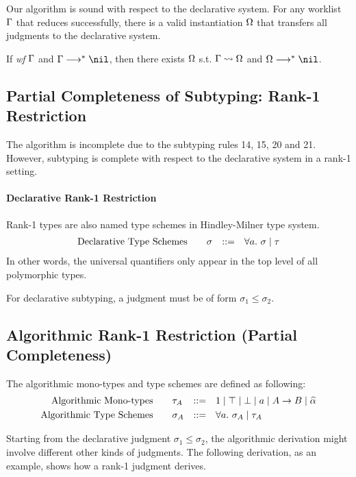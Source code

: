 Our algorithm is sound with respect to the declarative system.
For any worklist $\Gamma$ that reduces successfully,
there is a valid instantiation $\Omega$ that transfers all judgments
to the declarative system.
\begin{theorem}[Soundness]
If \emph{wf }$\Gamma$ and $\Gm \redto \nil$,
then there exists $\Omega$ s.t. $\Gamma \rightsquigarrow \Omega$ and $\Om \redto \nil$.
\end{theorem}

\subsection{Partial Completeness of Subtyping: Rank-1 Restriction}

The algorithm is incomplete due to the subtyping rules 14, 15, 20 and 21.
However, subtyping is complete with respect to the declarative system in a rank-1 setting.

\paragraph{Declarative Rank-1 Restriction}

Rank-1 types are also named type schemes in Hindley-Milner type system.
$$\begin{aligned}
    \text{Declarative Type Schemes}\qquad&\sigma &::=&\quad \all \sigma \mid \tau\\
\end{aligned}$$
In other words, the universal quantifiers only appear in the top level
of all polymorphic types.

For declarative subtyping, a judgment must be of form $\sigma_1 \le \sigma_2$.

\subsection{Algorithmic Rank-1 Restriction (Partial Completeness)}

The algorithmic mono-types and type schemes are defined as following:
$$\begin{aligned}
    \text{Algorithmic Mono-types}\qquad&\tau_A &::=&\quad
        1 \mid \top \mid \bot \mid a \mid A\to B \mid \al\\
    \text{Algorithmic Type Schemes}\qquad&\sigma_A &::=&\quad \all \sigma_A \mid \tau_A\\
\end{aligned}$$

Starting from the declarative judgment $\sigma_1 \le \sigma_2$,
the algorithmic derivation might involve different other kinds of judgments.
The following derivation, as an example, shows how a rank-1 judgment derives.

